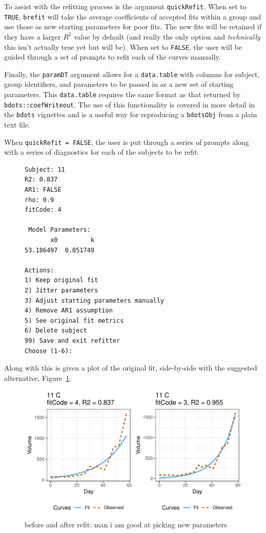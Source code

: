 \documentclass{article}
\newcommand{\xt}{\texttt}%
\begin{document}
To assist with the refitting process is the argument \xt{quickRefit}. When set to \xt{TRUE}, \xt{brefit} will take the average coefficients of accepted fits within a group and use those as new starting parameters for poor fits. The new fits will be retained if they have a larger $R^2$ value by default (and really the only option and \textit{technically} this isn't actually true yet but will be). When set to \xt{FALSE}, the user will be guided through a set of prompts to refit each of the curves manually.

Finally, the \texttt{paramDT} argument allows for a \xt{data.table} with columns for subject, group identifiers, and parameters to be passed in as a new set of starting parameters. This \xt{data.table} requires the same format as that returned by \xt{bdots::coefWriteout}. The use of this functionality is covered in more detail in the \xt{bdots} vignettes and is a useful way for reproducing a \xt{bdotsObj} from a plain text file. 

When \texttt{quickRefit = FALSE}, the user is put through a series of prompts along with a series of diagnostics for each of the subjects to be refit:


\begin{singlespace}
\begin{figure}[H]
\centering
\begin{BVerbatim}
Subject: 11
R2: 0.837
AR1: FALSE
rho: 0.9
fitCode: 4

 Model Parameters:
       x0         k 
53.186497  0.051749 

Actions:
1) Keep original fit
2) Jitter parameters
3) Adjust starting parameters manually
4) Remove AR1 assumption
5) See original fit metrics
6) Delete subject
99) Save and exit refitter
Choose (1-6):
\end{BVerbatim}
\end{figure}
\end{singlespace}


Along with this is given a plot of the original fit, side-by-side with the suggested alternative, Figure~\ref{fig:refit_plot}. 

\begin{figure}[H]
\centering
\includegraphics{img/mouse_refit_plot.pdf}
\caption{before and after refit: man i am good at picking new parameters}
\label{fig:refit_plot}
\end{figure}
\end{document}
